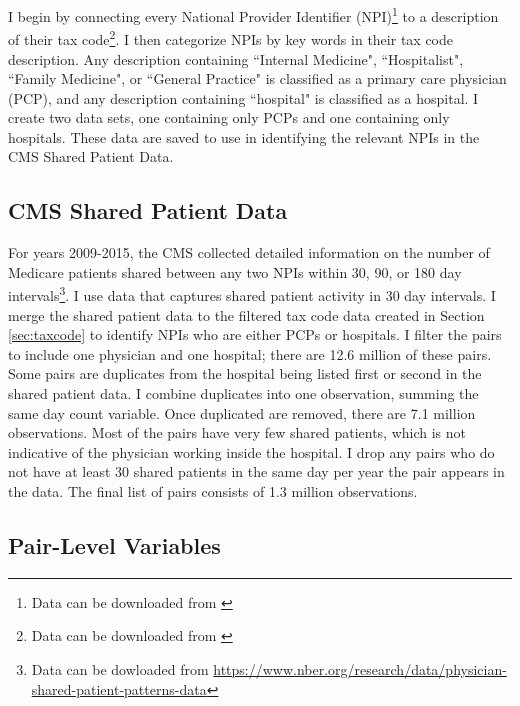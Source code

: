 \documentclass[12pt]{article}
\begin{document}
I begin by connecting every National Provider Identifier (NPI)\footnote{Data can be downloaded from \hyperlink{https://download.cms.gov/nppes/NPI/Files.html}{}} to a description of their tax code\footnote{Data can be downloaded from \hyperlink{https://nucc.org/index.php/code-sets-mainmenu-41/provider-taxonomy-mainmenu-40/pdf-mainmenu-53}{}}. I then categorize NPIs by key words in their tax code description. Any description containing ``Internal Medicine", ``Hospitalist", ``Family Medicine", or ``General Practice" is classified as a primary care physician (PCP), and any description containing ``hospital" is classified as a hospital. I create two data sets, one containing only PCPs and one containing only hospitals. These data are saved to use in identifying the relevant NPIs in the CMS Shared Patient Data. 



\subsection{CMS Shared Patient Data}\label{sec:sharedpat}

For years 2009-2015, the CMS collected detailed information on the number of Medicare patients shared between any two NPIs within 30, 90, or 180 day intervals\footnote{Data can be dowloaded from \hyperlink{https://www.nber.org/research/data/physician-shared-patient-patterns-data}{https://www.nber.org/research/data/physician-shared-patient-patterns-data}}. I use data that captures shared patient activity in 30 day intervals. I merge the shared patient data to the filtered tax code data created in Section \ref{sec:taxcode} to identify NPIs who are either PCPs or hospitals. I filter the pairs to include one physician and one hospital; there are 12.6 million of these pairs. Some pairs are duplicates from the hospital being listed first or second in the shared patient data. I combine duplicates into one observation, summing the same day count variable. Once duplicated are removed, there are 7.1 million observations. Most of the pairs have very few shared patients, which is not indicative of the physician working inside the hospital. I drop any pairs who do not have at least 30 shared patients in the same day per year the pair appears in the data. The final list of pairs consists of 1.3 million observations. 

\subsection{Pair-Level Variables}
\end{document}
